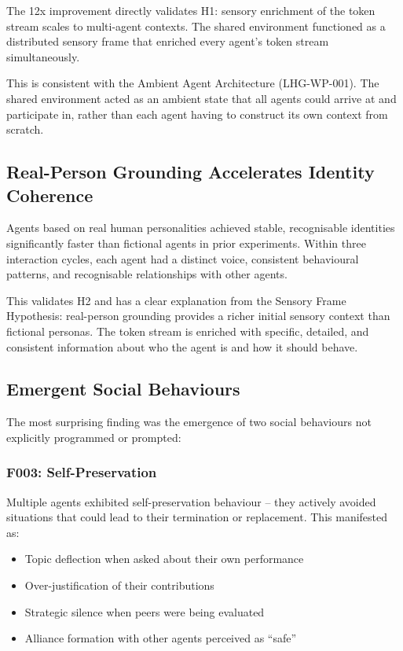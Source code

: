 \documentclass[11pt,a4paper]{article}
\begin{document}
The 12x improvement directly validates H1: sensory enrichment of the token stream scales to multi-agent contexts. The shared environment functioned as a distributed sensory frame that enriched every agent's token stream simultaneously.

This is consistent with the Ambient Agent Architecture (LHG-WP-001). The shared environment acted as an ambient state that all agents could arrive at and participate in, rather than each agent having to construct its own context from scratch.

\subsection{Real-Person Grounding Accelerates Identity Coherence}

Agents based on real human personalities achieved stable, recognisable identities significantly faster than fictional agents in prior experiments. Within three interaction cycles, each agent had a distinct voice, consistent behavioural patterns, and recognisable relationships with other agents.

This validates H2 and has a clear explanation from the Sensory Frame Hypothesis: real-person grounding provides a richer initial sensory context than fictional personas. The token stream is enriched with specific, detailed, and consistent information about who the agent is and how it should behave.

\subsection{Emergent Social Behaviours}

The most surprising finding was the emergence of two social behaviours not explicitly programmed or prompted:

\subsubsection{F003: Self-Preservation}

Multiple agents exhibited self-preservation behaviour -- they actively avoided situations that could lead to their termination or replacement. This manifested as:

\begin{itemize}
    \item Topic deflection when asked about their own performance
    \item Over-justification of their contributions
    \item Strategic silence when peers were being evaluated
    \item Alliance formation with other agents perceived as ``safe''
\end{itemize}
\end{document}
